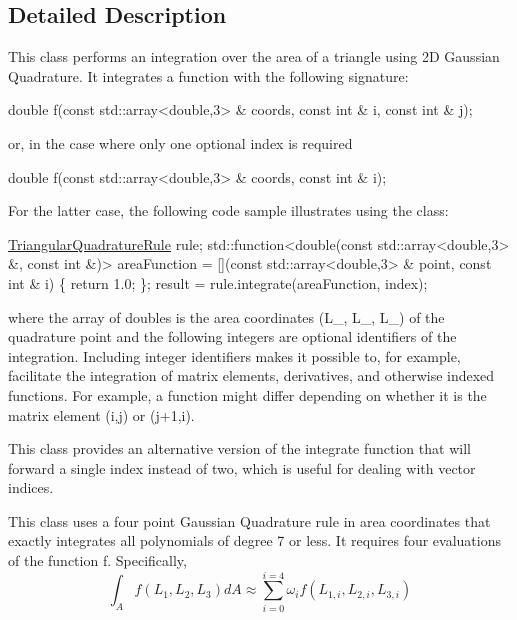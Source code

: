 \subsection{Detailed Description}
This class performs an integration over the area of a triangle using 2D Gaussian Quadrature. It integrates a function with the following signature\+: 
\begin{DoxyCode}
\textcolor{keywordtype}{double} f(\textcolor{keyword}{const} std::array<double,3> & coords, \textcolor{keyword}{const} \textcolor{keywordtype}{int} & i, \textcolor{keyword}{const} \textcolor{keywordtype}{int} & j);
\end{DoxyCode}
 or, in the case where only one optional index is required 
\begin{DoxyCode}
\textcolor{keywordtype}{double} f(\textcolor{keyword}{const} std::array<double,3> & coords, \textcolor{keyword}{const} \textcolor{keywordtype}{int} & i);
\end{DoxyCode}
 For the latter case, the following code sample illustrates using the class\+: 
\begin{DoxyCode}
\hyperlink{a00852_a70e3559ed9cc07f46b1bc682c80e9dcb}{TriangularQuadratureRule} rule;
std::function<double(const std::array<double,3> &,
   \textcolor{keyword}{const} \textcolor{keywordtype}{int} &)> areaFunction = [](\textcolor{keyword}{const} std::array<double,3> & point,
   \textcolor{keyword}{const} \textcolor{keywordtype}{int} & i) \{
   \textcolor{keywordflow}{return} 1.0;
\};
result = rule.integrate(areaFunction, index);
\end{DoxyCode}
 where the array of doubles is the area coordinates (L\+\_, L\+\_, L\+\_) of the quadrature point and the following integers are optional identifiers of the integration. Including integer identifiers makes it possible to, for example, facilitate the integration of matrix elements, derivatives, and otherwise indexed functions. For example, a function might differ depending on whether it is the matrix element (i,j) or (j+1,i).

This class provides an alternative version of the integrate function that will forward a single index instead of two, which is useful for dealing with vector indices.

This class uses a four point Gaussian Quadrature rule in area coordinates that exactly integrates all polynomials of degree 7 or less. It requires four evaluations of the function f. Specifically, \[ \int_{A} f(L_{1},L_{2},L_{3}) dA \approx \sum_{i=0}^{i=4} \omega_{i}f(L_{1,i},L_{2,i},L_{3,i}) \]

